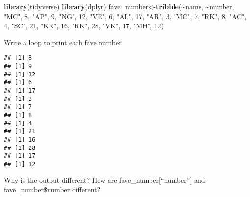 \documentclass[
]{article}
\newenvironment{Shaded}{\begin{snugshade}}{\end{snugshade}}
\newcommand{\ControlFlowTok}[1]{\textcolor[rgb]{0.13,0.29,0.53}{\textbf{#1}}}
\newcommand{\DecValTok}[1]{\textcolor[rgb]{0.00,0.00,0.81}{#1}}
\newcommand{\FunctionTok}[1]{\textcolor[rgb]{0.13,0.29,0.53}{\textbf{#1}}}
\newcommand{\NormalTok}[1]{#1}
\newcommand{\OtherTok}[1]{\textcolor[rgb]{0.56,0.35,0.01}{#1}}
\newcommand{\SpecialCharTok}[1]{\textcolor[rgb]{0.81,0.36,0.00}{\textbf{#1}}}
\newcommand{\StringTok}[1]{\textcolor[rgb]{0.31,0.60,0.02}{#1}}
\begin{document}
\begin{Shaded}
\begin{Highlighting}[]
\FunctionTok{library}\NormalTok{(tidyverse)}
\FunctionTok{library}\NormalTok{(dplyr)}
\NormalTok{fave\_number}\OtherTok{\textless{}{-}}\FunctionTok{tribble}\NormalTok{(}\SpecialCharTok{\textasciitilde{}}\NormalTok{name, }\SpecialCharTok{\textasciitilde{}}\NormalTok{number,}
                     \StringTok{"MC"}\NormalTok{, }\DecValTok{8}\NormalTok{,}
                     \StringTok{"AP"}\NormalTok{, }\DecValTok{9}\NormalTok{,}
                     \StringTok{"NG"}\NormalTok{, }\DecValTok{12}\NormalTok{,}
                     \StringTok{"VE"}\NormalTok{, }\DecValTok{6}\NormalTok{,}
                     \StringTok{"AL"}\NormalTok{, }\DecValTok{17}\NormalTok{,}
                     \StringTok{"AR"}\NormalTok{, }\DecValTok{3}\NormalTok{,}
                     \StringTok{"MC"}\NormalTok{, }\DecValTok{7}\NormalTok{,}
                     \StringTok{"RK"}\NormalTok{, }\DecValTok{8}\NormalTok{,}
                     \StringTok{"AC"}\NormalTok{, }\DecValTok{4}\NormalTok{,}
                     \StringTok{"SC"}\NormalTok{, }\DecValTok{21}\NormalTok{,}
                     \StringTok{"KK"}\NormalTok{, }\DecValTok{16}\NormalTok{,}
                     \StringTok{"RK"}\NormalTok{, }\DecValTok{28}\NormalTok{,}
                     \StringTok{"VK"}\NormalTok{, }\DecValTok{17}\NormalTok{,}
                     \StringTok{"MH"}\NormalTok{, }\DecValTok{12}\NormalTok{)}
\end{Highlighting}
\end{Shaded}

Write a loop to print each fave number

\begin{Shaded}
\end{Shaded}

\begin{verbatim}
## [1] 8
## [1] 9
## [1] 12
## [1] 6
## [1] 17
## [1] 3
## [1] 7
## [1] 8
## [1] 4
## [1] 21
## [1] 16
## [1] 28
## [1] 17
## [1] 12
\end{verbatim}

Why is the output different? How are fave\_number{[}``number''{]} and
fave\_number\$number different?
\end{document}
